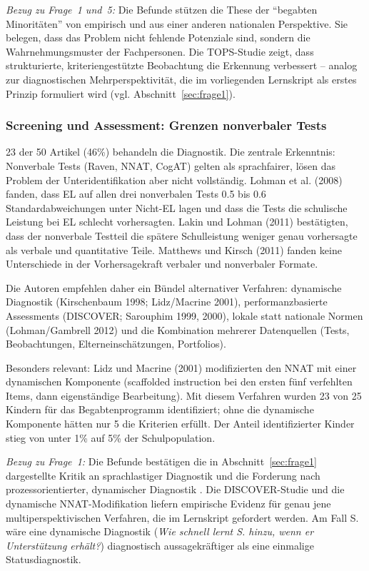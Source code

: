 \documentclass[ngerman, a4paper]{article}
\begin{document}
\textit{Bezug zu Frage~1 und~5:} Die Befunde stützen die These der
\enquote{begabten Minoritäten} von \textcite[S.\,576--585]{stamm2021fehlenderblick}
empirisch und aus einer anderen nationalen
Perspektive. Sie belegen, dass das Problem nicht fehlende Potenziale sind,
sondern die Wahrnehmungsmuster der Fachpersonen. Die TOPS-Studie zeigt,
dass strukturierte, kriteriengestützte Beobachtung die Erkennung
verbessert -- analog zur diagnostischen Mehrperspektivität, die im
vorliegenden Lernskript als erstes Prinzip formuliert wird
(vgl. Abschnitt~\ref{sec:frage1}).

\subsubsection*{Screening und Assessment: Grenzen nonverbaler Tests}

23 der 50 Artikel (46\%) behandeln die Diagnostik. Die zentrale
Erkenntnis: Nonverbale Tests (Raven, NNAT, CogAT) gelten als
sprachfairer, lösen das Problem der Unteridentifikation aber nicht
vollständig. Lohman et al. (2008) fanden, dass EL auf allen drei
nonverbalen Tests 0.5 bis 0.6 Standardabweichungen unter Nicht-EL lagen
und dass die Tests die schulische Leistung bei EL schlecht vorhersagten.
Lakin und Lohman (2011) bestätigten, dass der nonverbale Testteil die
spätere Schulleistung weniger genau vorhersagte als verbale und
quantitative Teile. Matthews und Kirsch (2011) fanden keine Unterschiede
in der Vorhersagekraft verbaler und nonverbaler Formate.

Die Autoren empfehlen daher ein Bündel alternativer Verfahren: dynamische
Diagnostik (Kirschenbaum 1998; Lidz/Macrine 2001), performanzbasierte
Assessments (DISCOVER; Sarouphim 1999, 2000), lokale statt nationale Normen
(Lohman/Gambrell 2012) und die Kombination mehrerer Datenquellen (Tests,
Beobachtungen, Elterneinschätzungen, Portfolios).

Besonders relevant: Lidz und Macrine (2001) modifizierten den NNAT mit
einer dynamischen Komponente (scaffolded instruction bei den ersten fünf
verfehlten Items, dann eigenständige Bearbeitung). Mit diesem Verfahren
wurden 23 von 25 Kindern für das Begabtenprogramm identifiziert; ohne die
dynamische Komponente hätten nur 5 die Kriterien erfüllt. Der Anteil
identifizierter Kinder stieg von unter 1\% auf 5\% der Schulpopulation.

\textit{Bezug zu Frage~1:} Die Befunde bestätigen die in
Abschnitt~\ref{sec:frage1} dargestellte Kritik an sprachlastiger
Diagnostik \parencite[S.\,93,\,169--172]{maehler2018diagnostik} und die Forderung nach
prozessorientierter, dynamischer Diagnostik
\parencite{lemas2023begriffsklaerung}.
Die
DISCOVER-Studie und die dynamische NNAT-Modifikation liefern empirische
Evidenz für genau jene multiperspektivischen Verfahren, die im Lernskript
gefordert werden. Am Fall S. wäre eine dynamische Diagnostik (\textit{Wie
  schnell lernt S. hinzu, wenn er Unterstützung erhält?}) diagnostisch
aussagekräftiger als eine einmalige Statusdiagnostik.
\end{document}

